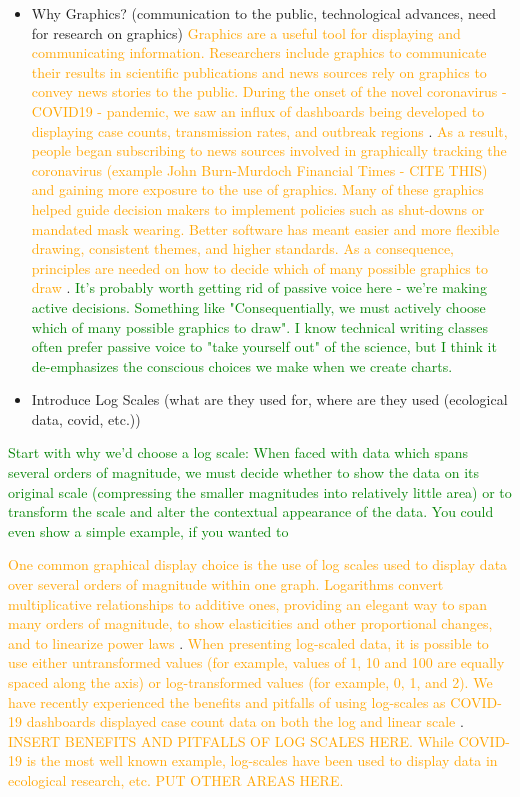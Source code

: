 \documentclass[]{interact}
\theoremstyle{plain}%
\theoremstyle{definition}
\theoremstyle{remark}
\begin{document}
\begin{itemize}
\item
  Why Graphics? (communication to the public, technological advances,
  need for research on graphics)
  \textcolor{Orange}{Graphics are a useful tool for displaying and communicating information. 
  Researchers include graphics to communicate their results in scientific publications and news sources rely on graphics to convey news stories to the public. 
  During the onset of the novel coronavirus - COVID19 - pandemic, we saw an influx of dashboards being developed to displaying case counts, transmission rates, and outbreak regions}
  \citep{lisa_charlotte_2020}.
  \textcolor{Orange}{As a result, people began subscribing to news sources involved in graphically tracking the coronavirus (example John Burn-Murdoch Financial Times - CITE THIS) and gaining more exposure to the use of graphics. 
  Many of these graphics helped guide decision makers to implement policies such as shut-downs or mandated mask wearing. 
  Better software has meant easier and more flexible drawing, consistent themes, and higher standards. 
  As a consequence, principles are needed on how to decide which of many possible graphics to draw}
  \citep{unwin_why_2020}.
  \textcolor{Green}{It's probably worth getting rid of passive voice here - we're making active decisions. Something like "Consequentially, we must actively choose which of many possible graphics to draw". I know technical writing classes often prefer passive voice to "take yourself out" of the science, but I think it de-emphasizes the conscious choices we make when we create charts.}
\item
  Introduce Log Scales (what are they used for, where are they used
  (ecological data, covid, etc.))
\end{itemize}

\textcolor{Green}{Start with why we'd choose a log scale: When faced with data which spans several orders of magnitude, we must decide whether to show the data on its original scale (compressing the smaller magnitudes into relatively little area) or to transform the scale and alter the contextual appearance of the data. You could even show a simple example, if you wanted to}

\textcolor{Orange}{One common graphical display choice is the use of log scales used to display data over several orders of magnitude within one graph. 
Logarithms convert multiplicative relationships to additive ones, providing an elegant way to span many orders of magnitude, to show elasticities and other proportional changes, and to linearize power laws}
\citep{menge_logarithmic_2018}.
\textcolor{Orange}{When presenting log-scaled data, it is possible to use either untransformed values (for example, values of 1, 10 and 100 are equally spaced along the axis) or log-transformed values (for example, 0, 1, and 2). 
We have recently experienced the benefits and pitfalls of using log-scales as COVID-19 dashboards displayed case count data on both the log and linear scale}
\citep{wade_fagen_ulmschneider_2020}.
\textcolor{Orange}{INSERT BENEFITS AND PITFALLS OF LOG SCALES HERE. 
While COVID-19 is the most well known example, log-scales have been used to display data in ecological research, etc. PUT OTHER AREAS HERE.}
\end{document}

